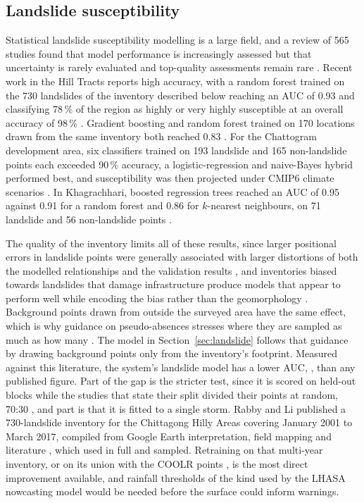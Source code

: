 \documentclass[10pt,a4paper,twocolumn]{article}
\begin{document}
\subsection{Landslide susceptibility}

Statistical landslide susceptibility modelling is a large field, and a review of 565 studies found that model performance is increasingly assessed but that uncertainty is rarely evaluated and top-quality assessments remain rare \citep{reichenbach2018}. Recent work in the Hill Tracts reports high accuracy, with a random forest trained on the 730 landslides of the inventory described below reaching an AUC of 0.93 and classifying 78\,\% of the region as highly or very highly susceptible at an overall accuracy of 98\,\% \citep{hossain2025}. Gradient boosting and random forest trained on 170 locations drawn from the same inventory both reached 0.83 \citep{roy2025}. For the Chattogram development area, six classifiers trained on 193 landslide and 165 non-landslide points each exceeded 90\,\% accuracy, a logistic-regression and naive-Bayes hybrid performed best, and susceptibility was then projected under CMIP6 climate scenarios \citep{islama2025}. In Khagrachhari, boosted regression trees reached an AUC of 0.95 against 0.91 for a random forest and 0.86 for $k$-nearest neighbours, on 71 landslide and 56 non-landslide points \citep{hasanm2024}.

The quality of the inventory limits all of these results, since larger positional errors in landslide points were generally associated with larger distortions of both the modelled relationships and the validation results \citep{steger2016}, and inventories biased towards landslides that damage infrastructure produce models that appear to perform well while encoding the bias rather than the geomorphology \citep{steger2021}. Background points drawn from outside the surveyed area have the same effect, which is why guidance on pseudo-absences stresses where they are sampled as much as how many \citep{barbetmassin2012}. The model in Section~\ref{sec:landslide} follows that guidance by drawing background points only from the inventory's footprint. Measured against this literature, the system's landslide model has a lower AUC, \CHTLSAUC{}, than any published figure. Part of the gap is the stricter test, since it is scored on held-out blocks while the studies that state their split divided their points at random, 70:30 \citep{islama2025, hasanm2024}, and part is that it is fitted to a single storm. Rabby and Li published a 730-landslide inventory for the Chittagong Hilly Areas covering January 2001 to March 2017, compiled from Google Earth interpretation, field mapping and literature \citep{rabby2019}, which \citet{hossain2025} used in full and \citet{roy2025} sampled. Retraining on that multi-year inventory, or on its union with the COOLR points \citep{juang2019}, is the most direct improvement available, and rainfall thresholds of the kind used by the LHASA nowcasting model \citep{kirschbaum2018} would be needed before the surface could inform warnings.
\end{document}
